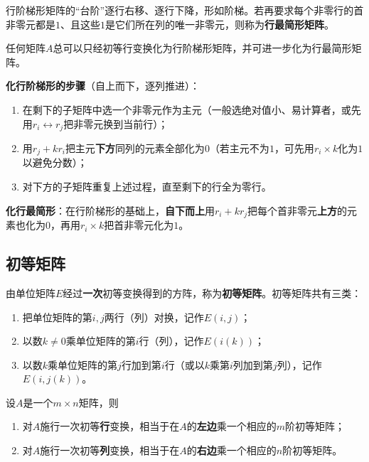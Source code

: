 行阶梯形矩阵的“台阶”逐行右移、逐行下降，形如阶梯。若再要求每个非零行的首非零元都是$1$、且这些$1$是它们所在列的唯一非零元，则称为\textbf{行最简形矩阵}。

\begin{theorem}
任何矩阵$A$总可以只经初等行变换化为行阶梯形矩阵，并可进一步化为行最简形矩阵。
\end{theorem}

\textbf{化行阶梯形的步骤}（自上而下，逐列推进）：
\begin{enumerate}
\item 在剩下的子矩阵中选一个非零元作为主元（一般选绝对值小、易计算者，或先用$r_i\leftrightarrow r_j$把非零元换到当前行）；
\item 用$r_j+kr_i$把主元\textbf{下方}同列的元素全部化为$0$（若主元不为$1$，可先用$r_i\times k$化为$1$以避免分数）；
\item 对下方的子矩阵重复上述过程，直至剩下的行全为零行。
\end{enumerate}

\textbf{化行最简形}：在行阶梯形的基础上，\textbf{自下而上}用$r_i+kr_j$把每个首非零元\textbf{上方}的元素也化为$0$，再用$r_i\times k$把首非零元化为$1$。


\subsection{初等矩阵}

\begin{definition}
由单位矩阵$E$经过\textbf{一次}初等变换得到的方阵，称为\textbf{初等矩阵}。初等矩阵共有三类：
\begin{enumerate}
\item 把单位矩阵的第$i,j$两行（列）对换，记作$E(i,j)$；
\item 以数$k\neq0$乘单位矩阵的第$i$行（列），记作$E(i(k))$；
\item 以数$k$乘单位矩阵的第$j$行加到第$i$行（或以$k$乘第$i$列加到第$j$列），记作$E(i,j(k))$。
\end{enumerate}
\end{definition}

\begin{theorem}
设$A$是一个$m\times n$矩阵，则
\begin{enumerate}
\item 对$A$施行一次初等\textbf{行}变换，相当于在$A$的\textbf{左边}乘一个相应的$m$阶初等矩阵；
\item 对$A$施行一次初等\textbf{列}变换，相当于在$A$的\textbf{右边}乘一个相应的$n$阶初等矩阵。
\end{enumerate}
\end{theorem}

